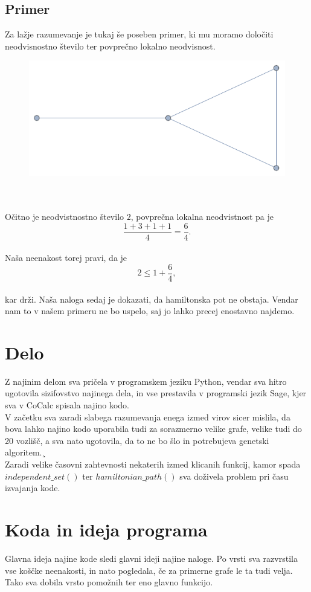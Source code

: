 \documentclass[12pt,a4paper]{amsart}
\theoremstyle{definition} %
\theoremstyle{plain} %
\begin{document}
\subsection{Primer}
Za lažje razumevanje je tukaj še poseben primer, ki mu moramo določiti neodvisnostno število ter povprečno lokalno neodvisnost.\\
\begin{figure}[h]
	\centering
	\includegraphics{slike/grafek}
\end{figure}
\\
\\
Očitno je neodvistnostno število $2$, povprečna lokalna neodvistnost pa je\\ $$\frac{1+3+1+1}{4}=\frac{6}{4}.$$
\ \\
Naša neenakost torej pravi, da je $$2 \leq 1+ \frac{6}{4},$$ 
\\kar drži. Naša naloga sedaj je dokazati, da hamiltonska pot ne obstaja. Vendar nam to v našem primeru ne bo uspelo, saj jo lahko precej enostavno najdemo.
\section{Delo}
Z najinim delom sva pričela v programskem jeziku Python, vendar sva hitro ugotovila sizifovstvo najinega dela, in vse prestavila v programski jezik Sage, kjer sva v CoCalc spisala najino kodo. \\
V začetku sva zaradi slabega razumevanja enega izmed virov sicer mislila, da bova lahko najino kodo uporabila tudi za sorazmerno velike grafe, velike tudi do 20 vozlišč, a sva nato ugotovila, da to ne bo šlo in potrebujeva genetski algoritem.¸\\
Zaradi velike časovni zahtevnosti nekaterih izmed klicanih funkcij, kamor spada $independent\_set()$ ter $hamiltonian\_path()$ sva doživela problem pri času izvajanja kode.
\section{Koda in ideja programa}
Glavna ideja najine kode sledi glavni ideji najine naloge. Po vrsti sva razvrstila vse koščke neenakosti, in nato pogledala, če za primerne grafe le ta tudi velja. Tako sva dobila vrsto pomožnih ter eno glavno funkcijo.
\end{document}
